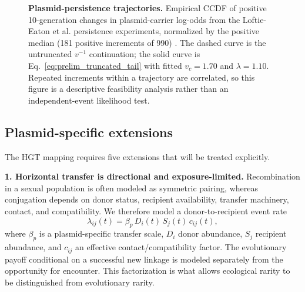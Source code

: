 \documentclass[12pt,a4paper]{article}
\begin{document}
\begin{figure}[H]
\caption{\textbf{Plasmid-persistence trajectories.} Empirical CCDF of positive 10-generation changes in plasmid-carrier log-odds from the Loftie-Eaton et al. persistence experiments, normalized by the positive median (181 positive increments of 990) \citep{loftieeaton2017}. The dashed curve is the untruncated $v^{-1}$ continuation; the solid curve is Eq.~\eqref{eq:prelim_truncated_tail} with fitted $v_c=1.70$ and $\lambda=1.10$. Repeated increments within a trajectory are correlated, so this figure is a descriptive feasibility analysis rather than an independent-event likelihood test.}
\label{fig:loftie_persist}
\end{figure}

\subsection{Plasmid-specific extensions}

The HGT mapping requires five extensions that will be treated explicitly.

\textbf{1. Horizontal transfer is directional and exposure-limited.} Recombination in a sexual population is often modeled as symmetric pairing, whereas conjugation depends on donor status, recipient availability, transfer machinery, contact, and compatibility. We therefore model a donor-to-recipient event rate
\begin{equation}
\lambda_{ij}(t)=\beta_p\,D_i(t)\,S_j(t)\,c_{ij}(t),
\end{equation}
where $\beta_p$ is a plasmid-specific transfer scale, $D_i$ donor abundance, $S_j$ recipient abundance, and $c_{ij}$ an effective contact/compatibility factor. The evolutionary payoff conditional on a successful new linkage is modeled separately from the opportunity for encounter. This factorization is what allows ecological rarity to be distinguished from evolutionary rarity.
\end{document}
